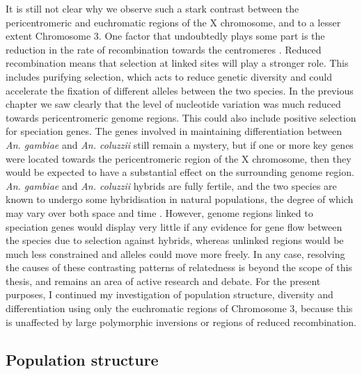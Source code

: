 \documentclass[a4paper,11pt,abstracton,hidelinks]{scrartcl}
\begin{document}
It is still not clear why we observe such a stark contrast between the pericentromeric and euchromatic regions of the X chromosome, and to a lesser extent Chromosome 3.
%
One factor that undoubtedly plays some part is the reduction in the rate of recombination towards the centromeres \parencite{Cruickshank2014}.
%
Reduced recombination means that selection at linked sites will play a stronger role.
%
This includes purifying selection, which acts to reduce genetic diversity and could accelerate the fixation of different alleles between the two species.
%
In the previous chapter we saw clearly that the level of nucleotide variation was much reduced towards pericentromeric genome regions.
%
This could also include positive selection for speciation genes.
%
The genes involved in maintaining differentiation between \textit{An. gambiae} and \textit{An. coluzzii} still remain a mystery, but if one or more key genes were located towards the pericentromeric region of the X chromosome, then they would be expected to have a substantial effect on the surrounding genome region.
%
\textit{An. gambiae} and \textit{An. coluzzii} hybrids are fully fertile, and the two species are known to undergo some hybridisation in natural populations, the degree of which may vary over both space and time \parencite{Weetman2012,Lee2013}.
%
However, genome regions linked to speciation genes would display very little if any evidence for gene flow between the species due to selection against hybrids, whereas unlinked regions would be much less constrained and alleles could move more freely.
%
In any case, resolving the causes of these contrasting patterns of relatedness is beyond the scope of this thesis, and remains an area of active research and debate.
%
For the present purposes, I continued my investigation of population structure, diversity and differentiation using only the euchromatic regions of Chromosome 3, because this is unaffected by large polymorphic inversions or regions of reduced recombination.


\subsection{Population structure}\label{subsec:pop-structure}
\end{document}
